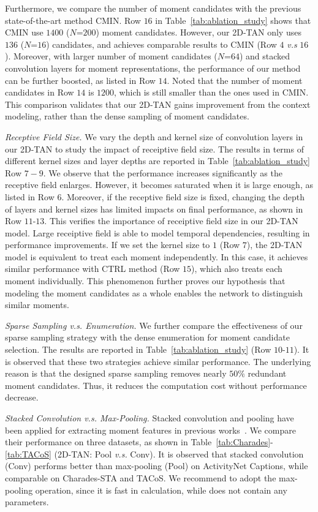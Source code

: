 \documentclass[letterpaper]{article} %
\begin{document}
Furthermore, we compare the number of moment candidates with the previous state-of-the-art method CMIN.
Row $16$ in Table~\ref{tab:ablation_study} shows that CMIN use $1400$ ($N$=$200$) moment candidates. However, our 2D-TAN only uses $136$ ($N$=$16$) candidates, and achieves comparable results to CMIN (Row $4$ \emph{v.s} $16$ ).
Moreover, with larger number of moment candidates ($N$=$64$) and stacked convolution layers for moment representations, the performance of our method can be further boosted, as listed in Row $14$.
Noted that the number of moment candidates in Row $14$ is $1200$, which is still smaller than the ones used in CMIN.
This comparison validates that our 2D-TAN gains improvement from the context modeling, rather than the dense sampling of moment candidates.

\textit{Receptive Field Size. } We vary the depth and kernel size of convolution layers in our 2D-TAN to study the impact of receiptive field size.
The results in terms of different kernel sizes and layer depths are reported in Table~\ref{tab:ablation_study} Row $7-9$.
We observe that the performance increases significantly as the receptive field enlarges.
However, it becomes saturated when it is large enough, as listed in Row $6$.
Moreover, if the receptive field size is fixed, changing the depth of layers and kernel sizes has limited impacts on final performance, as shown in Row $11$-$13$.
This verifies the importance of receiptive field size in our 2D-TAN model. Large receiptive field is able to model temporal dependencies, resulting in performance improvements.
If we set the kernel size to $1$ (Row $7$), the 2D-TAN model is equivalent to treat each moment independently. In this case, it achieves similar performance with CTRL method (Row $15$), which also treats each moment individually.
This phenomenon further proves our hypothesis that modeling the moment candidates as a whole enables the network to distinguish similar moments.

\textit{Sparse Sampling \emph{v.s.} Enumeration.}
We further compare the effectiveness of our sparse sampling strategy with the dense enumeration for moment candidate selection. The results are reported in Table~\ref{tab:ablation_study} (Row $10$-$11$). It is observed that these two strategies achieve similar performance. The underlying reason is that the designed sparse sampling removes nearly $50\%$ redundant moment candidates. Thus, it reduces the computation cost without performance decrease.

 \textit{Stacked Convolution \emph{v.s.} Max-Pooling.}
Stacked convolution and pooling have been applied for extracting moment features in previous works~\cite{hendricks17iccv,zhang2019man}.
We compare their performance on three datasets, as  shown in Table~\ref{tab:Charades}-\ref{tab:TACoS} (2D-TAN: Pool \emph{v.s.} Conv).
It is observed that stacked convolution (Conv) performs better than max-pooling (Pool) on ActivityNet Captions, while comparable on Charades-STA and TACoS. We recommend to adopt the max-pooling operation, since it is fast in calculation, while does not contain any parameters.
\end{document}

